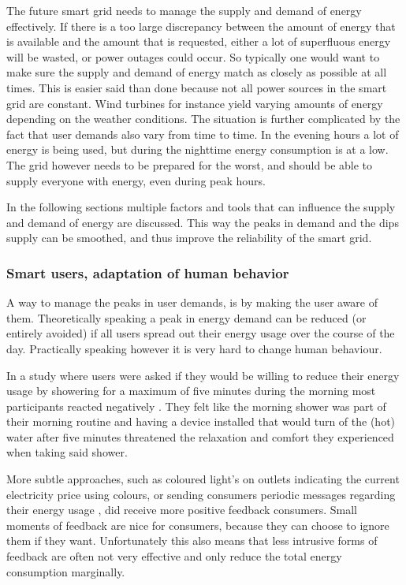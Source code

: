 The future smart grid needs to manage the supply and demand of energy effectively. If there is a too large discrepancy between the amount of energy that is available and the amount that is requested, either a lot of superfluous energy will be wasted, or power outages could occur.
So typically one would want to make sure the supply and demand of energy match as closely as possible at all times. This is easier said than done because not all power sources in the smart grid are constant. Wind turbines for instance yield varying amounts of energy depending on the weather conditions. The situation is further complicated by the fact that user demands also vary from time to time. In the evening hours a lot of energy is being used, but during the nighttime energy consumption is at a low. The grid however needs to be prepared for the worst, and should be able to supply everyone with energy, even during peak hours.

In the following sections multiple factors and tools that can influence the supply and demand of energy are discussed. This way the peaks in demand and the dips supply can be smoothed, and thus improve the reliability of the smart grid.

\subsubsection{Smart users, adaptation of human behavior}

A way to manage the peaks in user demands, is by making the user aware of them. Theoretically speaking a peak in energy demand can be reduced (or entirely avoided) if all users spread out their energy usage over the course of the day. Practically speaking however it is very hard to change human behaviour.

In a study where users were asked if they would be willing to reduce their energy usage by showering for a maximum of five minutes during the morning most participants reacted negatively \cite{GouldenBedwellRennick-EgglestoneEtAl2014}. They felt like the morning shower was part of their morning routine and having a device installed that would turn of the (hot) water after five minutes threatened the relaxation and comfort they experienced when taking said shower. 

More subtle approaches, such as coloured light's on outlets indicating the current electricity price using colours, or sending consumers periodic messages regarding their energy usage \cite{AyresRasemanShih2012}, did receive more positive feedback consumers. Small moments of feedback are nice for consumers, because they can choose to ignore them if they want. Unfortunately this also means that less intrusive forms of feedback are often not very effective and only reduce the total energy consumption marginally.

